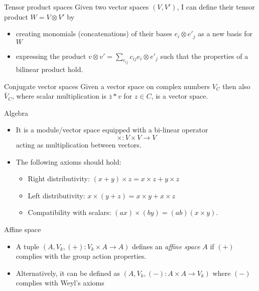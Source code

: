 \documentclass[presentation]{beamer}
\begin{document}
\begin{frame}[label={sec:org7d7dc0d}]{Tensor product spaces}
Given two vector spaces \((V,V')\), I can define their tensor product \(W =V
    \otimes V'\) by

\begin{itemize}
\item creating monomials (concatenations) of their bases \(e_i \otimes e'_j\) as
a new basis for \(W\)

\item expressing the product \(v \otimes v' = \sum_{c_{ij}}c_{ij} e_i \otimes e'_j\) such
that the properties of a bilinear product hold.
\end{itemize}
\end{frame}

\begin{frame}[label={sec:org59807e8}]{Conjugate vector spaces}
Given a vector space on complex numbers \(V_C\) then also \(\bar{V}_C\), where
 scalar multiplication is \(\bar{z}*v\) for \(z \in C\), is a vector space.
\end{frame}

\begin{frame}[label={sec:org432a074}]{Algebra}
\begin{itemize}
\item It is a module/vector space equipped with a bi-linear operator $$ \times: V \times V
      \rightarrow V$$ acting as \alert{multiplication} between vectors.

\item The following axioms should hold:

\begin{itemize}
\item Right distributivity: \((x + y) \times z = x \times z + y \times z\)
\item Left distributivity: \(x \times (y + z) = x \times y + x \times z\)
\item Compatibility with scalars: \((ax) \times (by) = (ab) (x \times y)\).
\end{itemize}
\end{itemize}
\end{frame}

\begin{frame}[label={sec:org4b8c6de}]{Affine space}
\begin{itemize}
\item A tuple \((A, V_k, (+): V_k \times A \rightarrow A)\) defines an \emph{affine space}
\(A\) if \((+)\) complies with the group action properties.
\item Alternatively, it can be defined as \((A, V_k, (-): A \times A \rightarrow V_k)\) where
\((-)\) complies with Weyl's axioms
\end{itemize}
\end{frame}
\end{document}
